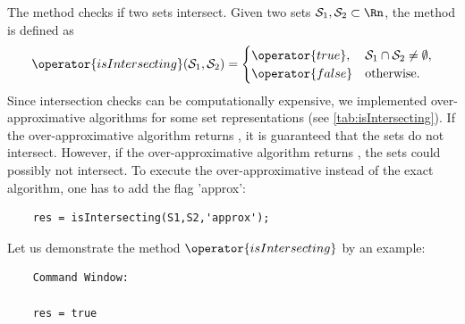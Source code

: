 The method  checks if two sets intersect. Given two sets $\mathcal{S}_1,\mathcal{S}_2 \subset \Rn$, the method  is defined as
	\begin{equation*}
		\operator{isIntersecting}(\mathcal{S}_1,\mathcal{S}_2) =
		\begin{cases}
			\operator{true}, & \mathcal{S}_1 \cap \mathcal{S}_2 \neq \emptyset, \\
			\operator{false} & \mathrm{otherwise}.
		\end{cases}
	\end{equation*}	
Since intersection checks can be computationally expensive, we implemented over-approximative algorithms for some set representations (see \cref{tab:isIntersecting}). If the over-approximative algorithm returns , it is guaranteed that the sets do not intersect. However, if the over-approximative algorithm returns , the sets could possibly not intersect. To execute the over-approximative instead of the exact algorithm, one has to add the flag 'approx':
\begin{verbatim}
	res = isIntersecting(S1,S2,'approx');
\end{verbatim}

Let us demonstrate the method $\operator{isIntersecting}$ by an example:

\begin{center}
\begin{minipage}[t]{0.40\textwidth}
	\vspace{10pt}
	\footnotesize
	
\end{minipage}
\begin{minipage}[t]{0.2\textwidth}
	\vspace{10pt}

	\begin{verbatim}
	Command Window:
		
	res = true
	\end{verbatim}
\end{minipage}
\begin{minipage}[t]{0.3\textwidth}
	\vspace{0pt}
	\centering
\end{minipage}
\end{center}

